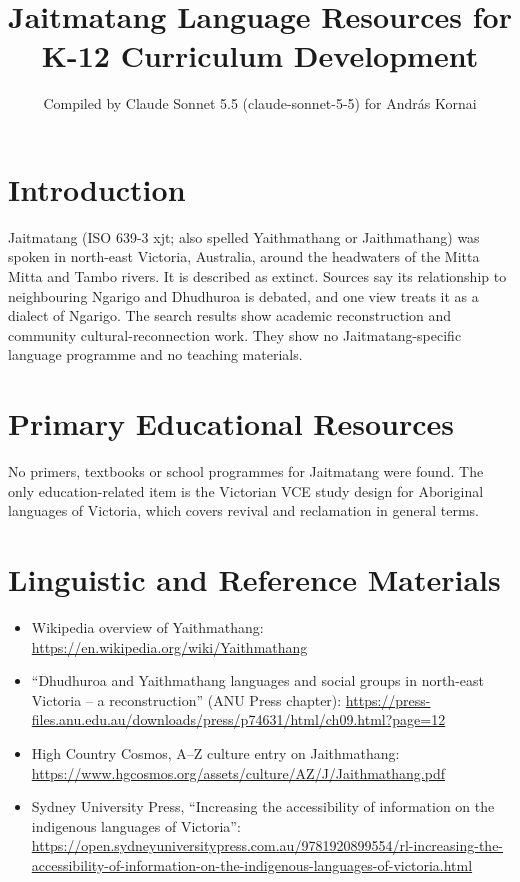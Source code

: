 \documentclass[12pt]{article}
\title{Jaitmatang Language Resources for K-12 Curriculum Development}
\author{Compiled by Claude Sonnet 5.5 (claude-sonnet-5-5) for Andr\'as Kornai}
\date{}
\begin{document}
\maketitle

\section{Introduction}
Jaitmatang (ISO 639-3 xjt; also spelled Yaithmathang or Jaithmathang) was spoken in north-east Victoria, Australia, around the headwaters of the Mitta Mitta and Tambo rivers. It is described as extinct. Sources say its relationship to neighbouring Ngarigo and Dhudhuroa is debated, and one view treats it as a dialect of Ngarigo. The search results show academic reconstruction and community cultural-reconnection work. They show no Jaitmatang-specific language programme and no teaching materials.

\section{Primary Educational Resources}
No primers, textbooks or school programmes for Jaitmatang were found. The only education-related item is the Victorian VCE study design for Aboriginal languages of Victoria, which covers revival and reclamation in general terms.

\section{Linguistic and Reference Materials}
\begin{itemize}
\item Wikipedia overview of Yaithmathang: \url{https://en.wikipedia.org/wiki/Yaithmathang}
\item ``Dhudhuroa and Yaithmathang languages and social groups in north-east Victoria -- a reconstruction'' (ANU Press chapter): \url{https://press-files.anu.edu.au/downloads/press/p74631/html/ch09.html?page=12}
\item High Country Cosmos, A--Z culture entry on Jaithmathang: \url{https://www.hgcosmos.org/assets/culture/AZ/J/Jaithmathang.pdf}
\item Sydney University Press, ``Increasing the accessibility of information on the indigenous languages of Victoria'': \url{https://open.sydneyuniversitypress.com.au/9781920899554/rl-increasing-the-accessibility-of-information-on-the-indigenous-languages-of-victoria.html}
\end{itemize}
\end{document}
